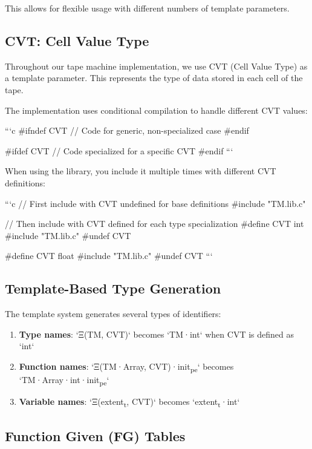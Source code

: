 \documentclass[11pt]{article}
\begin{document}
This allows for flexible usage with different numbers of template parameters.

\subsection{CVT: Cell Value Type}
\label{sec:org8359158}

Throughout our tape machine implementation, we use CVT (Cell Value Type) as a template parameter. This represents the type of data stored in each cell of the tape.

The implementation uses conditional compilation to handle different CVT values:

```c
\#ifndef CVT
  // Code for generic, non-specialized case
\#endif

\#ifdef CVT
  // Code specialized for a specific CVT
\#endif
```

When using the library, you include it multiple times with different CVT definitions:

```c
// First include with CVT undefined for base definitions
\#include "TM.lib.c"

// Then include with CVT defined for each type specialization
\#define CVT int
\#include "TM.lib.c"
\#undef CVT

\#define CVT float
\#include "TM.lib.c"
\#undef CVT
```

\subsection{Template-Based Type Generation}
\label{sec:orgcde6c14}

The template system generates several types of identifiers:

\begin{enumerate}
\item \textbf{\textbf{Type names}}: `Ξ(TM, CVT)` becomes `TM·int` when CVT is defined as `int`
\item \textbf{\textbf{Function names}}: `Ξ(TM·Array, CVT)·init\textsubscript{pe}` becomes `TM·Array·int·init\textsubscript{pe}`
\item \textbf{\textbf{Variable names}}: `Ξ(extent\textsubscript{t}, CVT)` becomes `extent\textsubscript{t}·int`
\end{enumerate}

\subsection{Function Given (FG) Tables}
\label{sec:org691e6ba}
\end{document}
